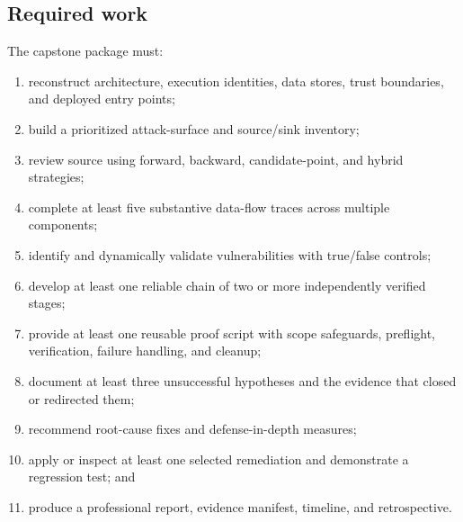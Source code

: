 \documentclass[11pt]{article}
\begin{document}
\subsection{Required work}
The capstone package must:
\begin{enumerate}
  \item reconstruct architecture, execution identities, data stores, trust boundaries, and deployed entry points;
  \item build a prioritized attack-surface and source/sink inventory;
  \item review source using forward, backward, candidate-point, and hybrid strategies;
  \item complete at least five substantive data-flow traces across multiple components;
  \item identify and dynamically validate vulnerabilities with true/false controls;
  \item develop at least one reliable chain of two or more independently verified stages;
  \item provide at least one reusable proof script with scope safeguards, preflight, verification, failure handling, and cleanup;
  \item document at least three unsuccessful hypotheses and the evidence that closed or redirected them;
  \item recommend root-cause fixes and defense-in-depth measures;
  \item apply or inspect at least one selected remediation and demonstrate a regression test; and
  \item produce a professional report, evidence manifest, timeline, and retrospective.
\end{enumerate}
\end{document}
